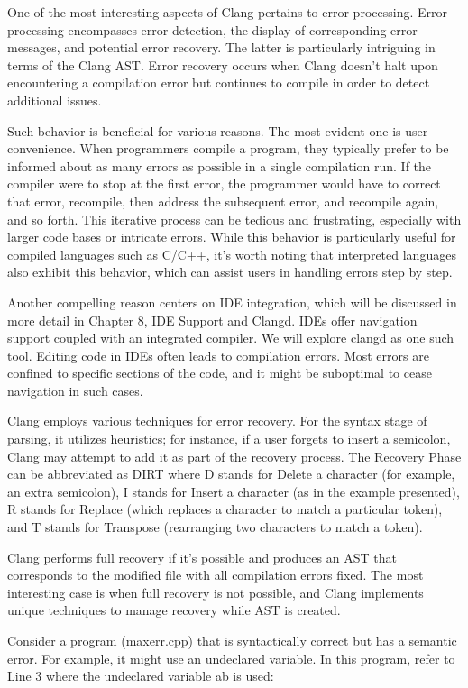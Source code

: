 One of the most interesting aspects of Clang pertains to error processing. Error processing encompasses error detection, the display of corresponding error messages, and potential error recovery. The latter is particularly intriguing in terms of the Clang AST. Error recovery occurs when Clang doesn't halt upon encountering a compilation error but continues to compile in order to detect additional issues.

Such behavior is beneficial for various reasons. The most evident one is user convenience. When programmers compile a program, they typically prefer to be informed about as many errors as possible in a single compilation run. If the compiler were to stop at the first error, the programmer would have to correct that error, recompile, then address the subsequent error, and recompile again, and so forth. This iterative process can be tedious and frustrating, especially with larger code bases or intricate errors. While this behavior is particularly useful for compiled languages such as C/C++, it's worth noting that interpreted languages also exhibit this behavior, which can assist users in handling errors step by step.

Another compelling reason centers on IDE integration, which will be discussed in more detail in Chapter 8, IDE Support and Clangd. IDEs offer navigation support coupled with an integrated compiler. We will explore clangd as one such tool. Editing code in IDEs often leads to compilation errors. Most errors are confined to specific sections of the code, and it might be suboptimal to cease navigation in such cases.

Clang employs various techniques for error recovery. For the syntax stage of parsing, it utilizes heuristics; for instance, if a user forgets to insert a semicolon, Clang may attempt to add it as part of the recovery process. The Recovery Phase can be abbreviated as DIRT where D stands for Delete a character (for example, an extra semicolon), I stands for Insert a character (as in the example presented), R stands for Replace (which replaces a character to match a particular token), and T stands for Transpose (rearranging two characters to match a token).

Clang performs full recovery if it's possible and produces an AST that corresponds to the modified file with all compilation errors fixed. The most interesting case is when full recovery is not possible, and Clang implements unique techniques to manage recovery while AST is created.

Consider a program (maxerr.cpp) that is syntactically correct but has a semantic error. For example, it might use an undeclared variable. In this program, refer to Line 3 where the undeclared variable ab is used:

